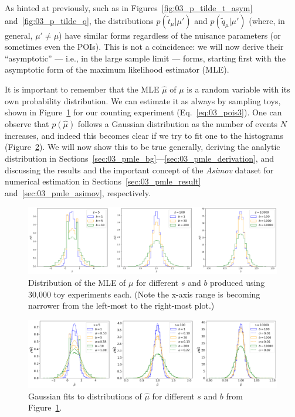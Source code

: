 As hinted at previously, such as in Figures~\ref{fig:03_p_tilde_t_asym} and~\ref{fig:03_p_tilde_q}, the distributions $p(\tilde{t}_\mu|\mu')$ and $p(\tilde{q}_\mu|\mu')$ (where, in general, $\mu' \neq \mu$) have similar forms regardless of the nuisance parameters (or sometimes even the POIs).
This is not a coincidence: we will now derive their ``asymptotic'' --- i.e., in the large sample limit --- forms, starting first with the asymptotic form of the maximum likelihood estimator (MLE).

It is important to remember that the MLE $\hat \mu$ of $\mu$ is a random variable with its own probability distribution. 
We can estimate it as always by sampling toys, shown in Figure~\ref{fig:03_p_mle} for our counting experiment (Eq.~\ref{eq:03_pois3}).
One can observe that $p(\hat \mu)$ follows a Gaussian distribution as the number of events $N$ increases, and indeed this becomes clear if we try to fit one to the histograms (Figure~\ref{fig:03_p_mle_fit}).
We will now show this to be true generally, deriving the analytic distribution in Sections~\ref{sec:03_pmle_bg}---\ref{sec:03_pmle_derivation}, and discussing the results and the important concept of the \textit{Asimov} dataset for numerical estimation in Sections~\ref{sec:03_pmle_result} and~\ref{sec:03_pmle_asimov}, respectively.

\begin{figure}[htb]
\centering
\includegraphics[width=\textwidth]{figures/03-Stats/05-asymptotic-mle/1.png}
\caption{Distribution of the MLE of $\mu$ for different $s$ and $b$ produced using 30,000 toy experiments each. (Note the x-axis range is becoming narrower from the left-most to the right-most plot.)}
\label{fig:03_p_mle}
\end{figure}

\begin{figure}[htb]
\centering
\includegraphics[width=\textwidth]{figures/03-Stats/05-asymptotic-mle/2.png}
\caption{Gaussian fits to distributions of $\hat\mu$ for different $s$ and $b$ from Figure~\ref{fig:03_p_mle}.}
\label{fig:03_p_mle_fit}
\end{figure}


